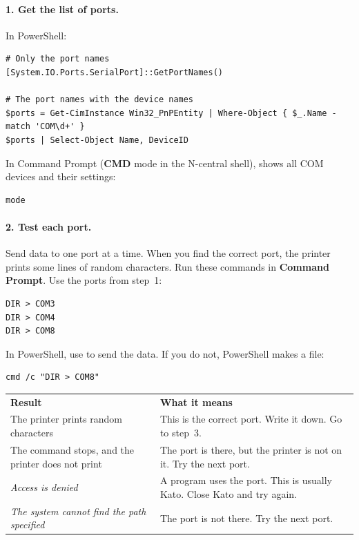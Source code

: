 \documentclass[a4paper,10pt]{article}
\begin{document}
\paragraph{1. Get the list of ports.} In PowerShell:

\begin{lstlisting}
# Only the port names
[System.IO.Ports.SerialPort]::GetPortNames()

# The port names with the device names
$ports = Get-CimInstance Win32_PnPEntity | Where-Object { $_.Name -match 'COM\d+' }
$ports | Select-Object Name, DeviceID
\end{lstlisting}

\noindent In Command Prompt (\textbf{CMD} mode in the N-central shell),
 shows all COM devices and their settings:

\begin{lstlisting}
mode
\end{lstlisting}

\paragraph{2. Test each port.} Send data to one port at a time. When you
find the correct port, the printer prints some lines of random characters.
Run these commands in \textbf{Command Prompt}. Use the ports from step~1:

\begin{lstlisting}
DIR > COM3
DIR > COM4
DIR > COM8
\end{lstlisting}

\noindent In PowerShell, use  to send the data. If you do not, PowerShell
makes a file:

\begin{lstlisting}
cmd /c "DIR > COM8"
\end{lstlisting}

\begin{center}
\renewcommand{\arraystretch}{1.3}\small
\begin{tabularx}{\textwidth}{L{54mm} X}
\color{white}\textbf{Result} &
\color{white}\textbf{What it means}\\
The printer prints random characters &
This is the correct port. Write it down. Go to step~3.\\
The command stops, and the printer does not print &
The port is there, but the printer is not on it. Try the next port.\\
\emph{Access is denied} &
A program uses the port. This is usually Kato. Close Kato and try
again.\\
\emph{The system cannot find the path specified} &
The port is not there. Try the next port.\\
\end{tabularx}
\end{center}
\end{document}

